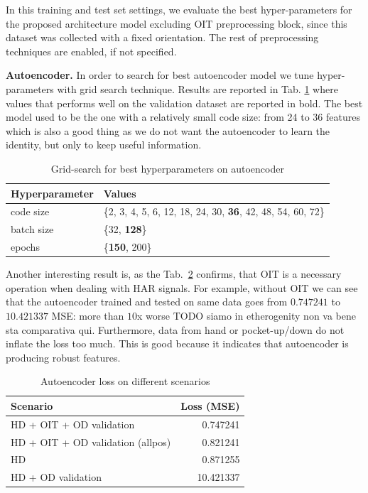 In this training and test set settings, we evaluate the best
hyper-parameters for the proposed architecture model excluding OIT
preprocessing block, since this dataset was collected with a fixed
orientation. The rest of preprocessing techniques are enabled, if not
specified.

\textbf{Autoencoder.}  In order to search for best autoencoder model
we tune hyper-parameters with grid search technique. Results are
reported in Tab. \ref{tab:ae-hyperparams} where values that performs
well on the validation dataset are reported in bold.  The best model
used to be the one with a relatively small code size: from 24 to 36
features which is also a good thing as we do not want the autoencoder
to learn the identity, but only to keep useful information.
\begin{table}[H]
  \centering
  \begin{tabular}{lp{4cm}}
    \hline
    Hyperparameter & Values \\
    \hline
    code size & \{2, 3, 4, 5, 6, 12, 18, 24, 30, \textbf{36}, 42, 48, 54, 60, 72\} \\
    batch size & \{32, \textbf{128}\} \\
    epochs & \{\textbf{150}, 200\} \\
    \hline
  \end{tabular}
  \caption{Grid-search for best hyperparameters on autoencoder}
  \label{tab:ae-hyperparams}
\end{table}

Another interesting result is, as the Tab.~\ref{tab:ae-loss} confirms,
that OIT is a necessary
operation when dealing with HAR signals. For example, without OIT we
can see that the autoencoder trained and tested on same data goes from
$0.747241$ to $10.421337$ MSE: more than $10$x worse TODO siamo in etherogenity non va bene sta comparativa qui. Furthermore,
data from hand or pocket-up/down do not inflate the loss too
much. This is good because it indicates that autoencoder is producing
robust features.
\begin{table}[H]
  \centering
  \begin{tabular}{lr}
    \hline
    Scenario & Loss (MSE) \\
    \hline
    HD + OIT + OD validation & 0.747241 \\
    HD + OIT + OD validation (allpos) & 0.821241 \\
    HD & 0.871255 \\
    HD + OD validation & 10.421337 \\
    \hline
  \end{tabular}
  \caption{Autoencoder loss on different scenarios}
  \label{tab:ae-loss}
\end{table}

